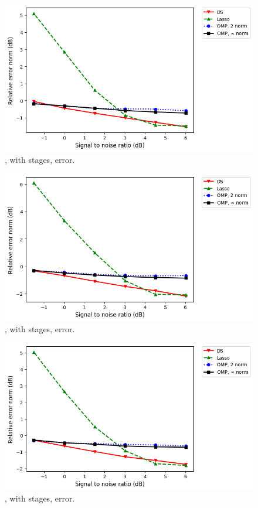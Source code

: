 %
\begin {figure} [H]
\includegraphics [width = 0.8 \textwidth] {error-medium-more-tall-six-usual.png}
\caption {, with  stages, error.}
\end {figure}
%
\begin {figure} [H]
\includegraphics [width = 0.8 \textwidth] {error-big-more-square-six-usual.png}
\caption {, with  stages, error.}
\end {figure}
%
\begin {figure} [H]
\includegraphics [width = 0.8 \textwidth] {error-big-more-wide-six-usual.png}
\caption {, with  stages, error.}
\end {figure}
